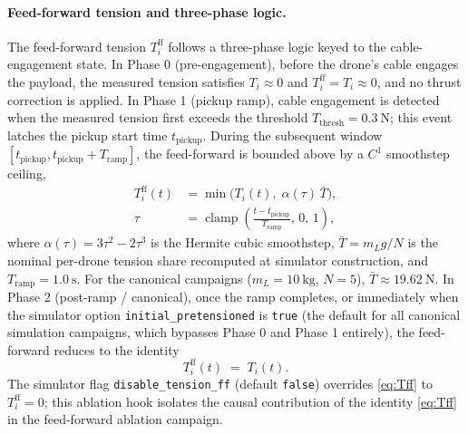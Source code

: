 \paragraph{Feed-forward tension and three-phase logic.} The feed-forward tension $T_i^{\mathrm{ff}}$ follows a three-phase logic keyed to the cable-engagement state. In Phase 0 (pre-engagement), before the drone's cable engages the payload, the measured tension satisfies $T_i \approx 0$ and $T_i^{\mathrm{ff}} = T_i \approx 0$, and no thrust correction is applied. In Phase 1 (pickup ramp), cable engagement is detected when the measured tension first exceeds the threshold $T_{\mathrm{thresh}} = \SI{0.3}{\newton}$; this event latches the pickup start time $t_{\mathrm{pickup}}$. During the subsequent window $[t_{\mathrm{pickup}}, t_{\mathrm{pickup}} + T_{\mathrm{ramp}}]$, the feed-forward is bounded above by a $C^1$ smoothstep ceiling,
\begin{align}
\label{eq:Tff-ramp}
  T_i^{\mathrm{ff}}(t)
    &= \min\!\bigl(T_i(t),\;\alpha(\tau)\,\bar{T}\bigr),\\
  \tau &= \operatorname{clamp}\!\!\left(
    \frac{t - t_{\mathrm{pickup}}}{T_{\mathrm{ramp}}},\, 0,\, 1
  \right),\nonumber
\end{align}
where $\alpha(\tau) = 3\tau^2 - 2\tau^3$ is the Hermite cubic smoothstep, $\bar{T} = m_L g / N$ is the nominal per-drone tension share recomputed at simulator construction, and $T_{\mathrm{ramp}} = \SI{1.0}{\second}$. For the canonical campaigns ($m_L = \SI{10}{\kilo\gram}$, $N = 5$), $\bar{T} \approx \SI{19.62}{\newton}$. In Phase 2 (post-ramp / canonical), once the ramp completes, or immediately when the simulator option \texttt{initial\_pretensioned} is \texttt{true} (the default for all canonical simulation campaigns, which bypasses Phase 0 and Phase 1 entirely), the feed-forward reduces to the identity
\begin{equation}
  \boxed{T_i^{\mathrm{ff}}(t) \;=\; T_i(t).}
  \label{eq:Tff}
\end{equation}
The simulator flag \texttt{disable\_tension\_ff} (default \texttt{false}) overrides \eqref{eq:Tff} to $T_i^{\mathrm{ff}} = 0$; this ablation hook isolates the causal contribution of the identity \eqref{eq:Tff} in the feed-forward ablation campaign.

